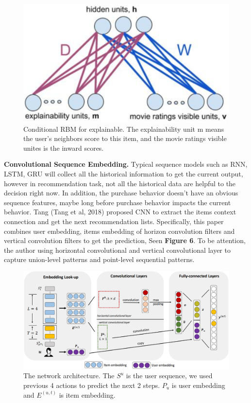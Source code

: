 \documentclass[10pt,twocolumn,letterpaper]{article}
\begin{document}
\begin{figure}
	\begin{center}
		\includegraphics[width=0.8\linewidth]{RBM.png}
	\end{center}
	\caption{Conditional RBM for explainable. The explainability unit m means the user's neighbors score to this item, and the movie ratings visible unites is the inward scores.}
	\label{fig:long}
	\label{fig:onecol}
\end{figure}

{\bf Convolutional Sequence Embedding.} Typical sequence models such as RNN, LSTM, GRU will collect all the historical information to get the current output, however in recommendation task, not all the historical data are helpful to the decision right now. In addition, the purchase behavior doesn't have an obvious sequence features, maybe long before purchase behavior impacts the current behavior. Tang (Tang et al, 2018) proposed CNN to extract the items context connection and get the next recommendation lists.  Specifically, this paper combines user embedding, items embedding of horizon convolution filters and vertical convolution filters to get the prediction, Seen 
{\bf Figure 6}. To be attention, the author using horizontal convolutional and vertical convolutional layer to capture union-level patterns and point-level sequential patterns.  
\begin{figure}
	\begin{center}
		\includegraphics[width=.9\linewidth]{CNN.png}
	\end{center}
	\caption{The network architecture. The $S^u$ is the user sequence, we used previous 4 actions to predict the next 2 steps. $P_u$ is user embedding and $E^{(u,t)}$ is item embedding.}
	\label{fig:short}
\end{figure}
\end{document}
